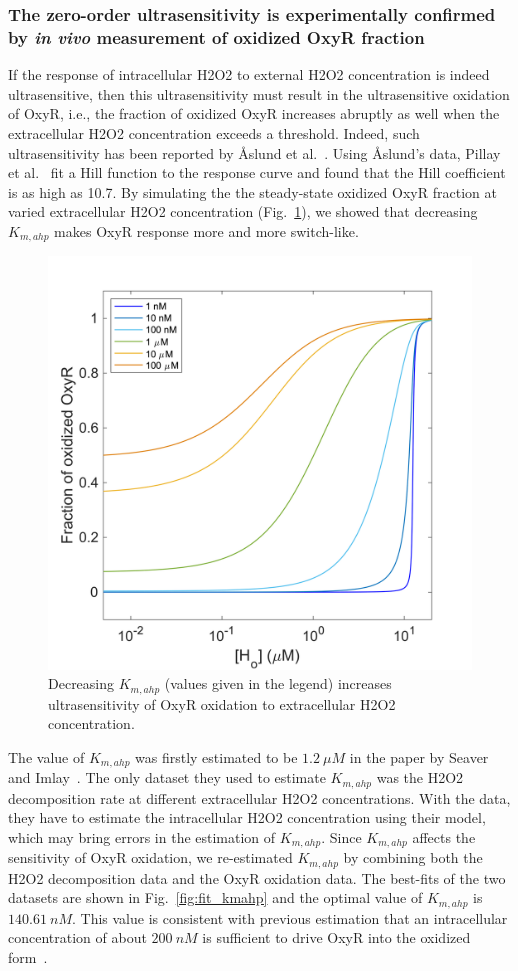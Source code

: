 \documentclass[10pt]{article}
\begin{document}
\subsubsection{The zero-order ultrasensitivity is experimentally confirmed by \textit{in vivo} measurement of oxidized OxyR fraction}
\label{eq:the_zeroorder_ultrasensivity}

If the response of intracellular H2O2 to external H2O2 concentration is indeed ultrasensitive, then this ultrasensitivity must result in the ultrasensitive oxidation of OxyR, i.e., the fraction of oxidized OxyR increases abruptly as well when the extracellular H2O2 concentration exceeds a threshold. Indeed, such ultrasensitivity has been reported by Åslund et al.~\cite{aaslund1999regulation}. Using Åslund's data, Pillay et al.~\cite{pillay2016quantitative} fit a Hill function to the response curve and found that the Hill coefficient is as high as 10.7. By simulating the the steady-state oxidized OxyR fraction at varied extracellular H2O2 concentration (Fig.~\ref{fig:decrease_kmahp}), we showed that decreasing $K_{m,ahp}$ makes OxyR response more and more switch-like.

\begin{figure}[H]
\centering
  \includegraphics[width=0.5\linewidth]{ultrasensitivity_oxyr_decrease_Kmahp.png}
  \caption{Decreasing $K_{m,ahp}$ (values given in the legend) increases ultrasensitivity of OxyR oxidation to extracellular H2O2 concentration.}
  \label{fig:decrease_kmahp}
\end{figure}

The value of $K_{m,ahp}$ was firstly estimated to be $1.2~\mu M$ in the paper by Seaver and Imlay~\cite{seaver2001hydrogen}. The only dataset they used to estimate $K_{m,ahp}$ was the H2O2 decomposition rate at different extracellular H2O2 concentrations. With the data, they have to estimate the intracellular H2O2 concentration using their model, which may bring errors in the estimation of $K_{m,ahp}$. Since $K_{m,ahp}$ affects the sensitivity of OxyR oxidation, we re-estimated $K_{m,ahp}$ by combining both the H2O2 decomposition data and the OxyR oxidation data. The best-fits of the two datasets are shown in Fig.~\ref{fig:fit_kmahp} and the optimal value of $K_{m,ahp}$ is $140.61~nM$. This value is consistent with previous estimation that an intracellular concentration of about $200~nM$ is sufficient to drive OxyR into the oxidized form~\cite{imlay2013molecular}.
\end{document}
